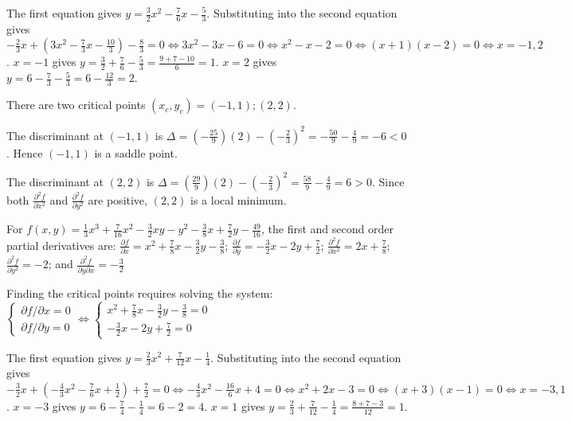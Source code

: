 \documentclass{article}
\newcommand{\partdiff}[2]{\frac{\partial #1}{\partial #2}}
\newcommand{\dr}[1]{\textcolor{dark_red}{#1}}
\begin{document}
\dr{The first equation gives \(y = \frac{3}{2}x^2 - \frac{7}{6}x - \frac{5}{3}\). Substituting into the second equation gives \\ \(-\frac{2}{3}x + (3x^2 -\frac{7}{3}x - \frac{10}{3}) - \frac{8}{3} = 0 \iff 3x^2 - 3x - 6 = 0 \iff x^2 - x - 2 = 0 \iff (x + 1)(x - 2) = 0 \iff x = -1,2\). \(x = -1\) gives \(y = \frac{3}{2} + \frac{7}{6} - \frac{5}{3} = \frac{9 + 7 - 10}{6} = 1\). \(x = 2\) gives \(y = 6 - \frac{7}{3} - \frac{5}{3} = 6 - \frac{12}{3} = 2\).}

\dr{There are two critical points \((x_c, y_c) = (-1,1); (2,2)\).}

\dr{The discriminant at \((-1,1)\) is \(\Delta = (-\frac{25}{9})(2) - (-\frac{2}{3})^2 = -\frac{50}{9} - \frac{4}{9} = -6 < 0\). Hence \((-1,1)\) is a saddle point.}

\dr{The discriminant at \((2,2)\) is \(\Delta = (\frac{29}{9})(2) - (-\frac{2}{3})^2 = \frac{58}{9} - \frac{4}{9} = 6 > 0\). Since both \(\frac{\partial^2 f}{\partial x^2}\) and \(\frac{\partial^2 f}{\partial y^2}\) are positive, \((2,2)\) is a local minimum.}

\vspace{1cm}

\dr{For \(f(x,y) = \frac{1}{3}x^3 + \frac{7}{16}x^2 - \frac{3}{2}xy - y^2 - \frac{3}{8}x + \frac{7}{2}y - \frac{49}{16}\), the first and second order partial derivatives are: 
\(\partdiff{f}{x} = x^2 + \frac{7}{8}x - \frac{3}{2}y - \frac{3}{8}\); \(\partdiff{f}{y} = -\frac{3}{2}x - 2y + \frac{7}{2}\); \(\frac{\partial^2 f}{\partial x^2} = 2x + \frac{7}{8}\); \(\frac{\partial^2 f}{\partial y^2} = -2\); and \(\frac{\partial^2 f}{\partial y \partial x} = -\frac{3}{2}\)}

\dr{Finding the critical points requires solving the system: \(\left\{\begin{array}{c} \partial f/\partial x = 0 \\ \partial f/\partial y = 0 \end{array}\right. \iff \left\{\begin{array}{c} x^2 + \frac{7}{8}x - \frac{3}{2}y - \frac{3}{8} = 0 \\ -\frac{3}{2}x - 2y + \frac{7}{2} = 0 \end{array}\right.\)}

\dr{The first equation gives \(y = \frac{2}{3}x^2 + \frac{7}{12}x - \frac{1}{4}\). Substituting into the second equation gives \\ \(-\frac{3}{2}x + (-\frac{4}{3}x^2 -\frac{7}{6}x + \frac{1}{2}) + \frac{7}{2} = 0 \iff -\frac{4}{3}x^2 - \frac{16}{6}x + 4 = 0 \iff x^2 + 2x - 3 = 0 \iff (x + 3)(x - 1) = 0 \iff x = -3,1\). \(x = -3\) gives \(y = 6 - \frac{7}{4} - \frac{1}{4} = 6 - 2 = 4\). \(x = 1\) gives \(y = \frac{2}{3} + \frac{7}{12} - \frac{1}{4} = \frac{8 + 7 - 3}{12} = 1\).}
\end{document}
